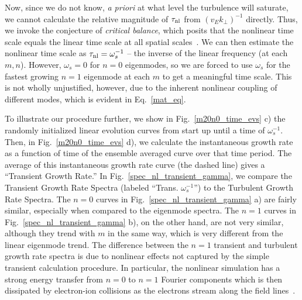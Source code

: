 \documentclass[showpacs,preprintnumbers,amsmath,amssymb,superscriptaddress,aip]{revtex4-1}
\begin{document}
Now, since we do not know, \emph{a priori} at what level the turbulence will saturate, we cannot calculate the relative magnitude of $\tau_{\rm{nl}}$ from $(v_E k_\perp)^{-1}$ directly.
Thus, we invoke the conjecture of \emph{critical balance}, which posits that the nonlinear time scale equals the linear time scale at all spatial scales~\cite{schekochihin2012}. 
We can then estimate the nonlinear time scale as $\tau_{\rm{nl}} = \omega_s^{-1}$ -- the inverse of the linear frequency (at each $m,n$).
However, $\omega_s = 0$ for $n=0$ eigenmodes, so we are forced to use $\omega_s$ for the fastest growing $n=1$ eigenmode at each $m$ to get a meaningful time scale. This is not wholly
unjustified, however, due to the inherent nonlinear coupling of different modes, which is evident in Eq.~\ref{mat_eq}.

To illustrate our procedure further, we show in Fig.~\ref{m20n0_time_evs} c) the randomly initialized linear evolution curves from start up until a time of $\omega_s^{-1}$. 
Then, in Fig.~\ref{m20n0_time_evs} d), we calculate the instantaneous growth rate as a function of time of the ensemble averaged curve over that time period.
The average of this instantaneous growth rate curve (the dashed line) gives a ``Transient Growth Rate.''
In Fig.~\ref{spec_nl_transient_gamma}, we compare the Transient Growth Rate Spectra (labeled ``Trans. $\omega_s^{-1}$'') to the Turbulent Growth Rate Spectra.
The $n=0$ curves in Fig.~\ref{spec_nl_transient_gamma} a) are fairly similar, especially when compared to the eigenmode spectra.
The $n=1$ curves in Fig.~\ref{spec_nl_transient_gamma} b), on the other hand, are not very similar, although they trend with $m$ in the same way, which is very different from the linear eigenmode trend.
The difference between the $n=1$ transient and turbulent growth rate spectra is due to nonlinear effects not captured by the simple transient calculation procedure. In particular, the nonlinear
simulation has a strong energy transfer from $n=0$ to $n=1$ Fourier components which is then dissipated by electron-ion collisions as the electrons stream along the field lines~\cite{friedman2012b}. 
\end{document}
